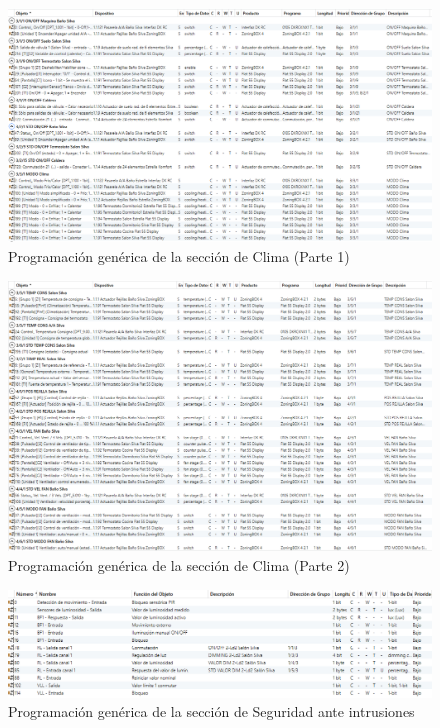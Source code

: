 \begin{landscape}
\begin{figure}[H]
\includegraphics[width=1.65\textwidth]{figures/prog_clima1.png}   
\caption{Programación genérica de la sección de Clima (Parte 1)}
\label{fig:prog_clima1}
\end{figure}
\begin{figure}[H]
\includegraphics[width=1.65\textwidth]{figures/prog_clima2.png}   \caption{Programación genérica de la sección de Clima (Parte 2)}
\label{fig:prog_clima2}
\end{figure}

\begin{figure}[H]
\includegraphics[width=1.55\textwidth]{figures/prog_pres.png}   
\caption{Programación genérica de la sección de Seguridad ante intrusiones}
\label{fig:prog_pres}
\end{figure}


\end{landscape}
